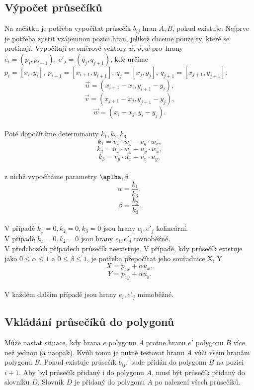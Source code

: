 \documentclass{article}
\begin{document}
\subsection{\small{Výpočet průsečíků}}
Na začátku je potřeba vypočítat průsečík $b_{ij}$ hran $A, B$, pokud existuje. Nejprve je potřeba zjistit vzájemnou pozici hran, jelikož chceme pouze ty, které se protínají. Vypočítají se směrové vektory $\vec{u}, \vec{v}, \vec{w}$ pro~hrany $e_{i} = (p_{i}, p_{i+1}),~e'_{j} = (q_{j}, q_{j+1})$, kde určíme $p_{i} = [x_{i}, y_{i}],~p_{i+1} = [x_{i+1}, y_{i+1}],~q_{j} = [x_{j}, y_{j}],~q_{j+1} = [x_{j+1}, y_{j+1}]$:\\
\[\vec{u} = (x_{i+1} - x_{i}, y_{i+1} - y_{i}),\]
\[\vec{v} = (x_{j+1} - x_{j}, y_{j+1} - y_{j}),\]
\[\vec{w} = (x_{i} - x_{j}, y_{i} - y_{j}).\]
\vspace{0cm}\\
Poté dopočítáme determinanty $k_{1}, k_{2}, k_{3}$\\
\[k_{1} = v_{x} \cdot w_{y} - v_{y} \cdot w_{x},\]
\[k_{2} = u_{x} \cdot w_{y} - u_{y} \cdot w_{x},\]
\[k_{3} = v_{y} \cdot u_{x} - v_{x} \cdot u_{y},\]
\vspace{0cm}\\
z nichž vypočítáme parametry $\aplha, \beta$\\
\[\alpha = \frac{k_{1}}{k_{3}},\]
\[\beta = \frac{k_{2}}{k_{3}}.\]
\vspace{0cm}\\
V případě $k_{1} = 0, k_{2} = 0, k_{3} = 0$ jsou hrany $e_{i}, e'_{j}$ kolineární.\\
V případě $k_{1} = 0, k_{2} = 0$ jsou hrany $e_{i}, e'_{j}$ rovnoběžné.\\
V předchozích případech průsečík neexistuje. V případě, kdy průsečík existuje jako $0 \leq \alpha \leq 1$ a $0 \leq \beta \leq 1$, je potřeba přepočítat jeho souřadnice X, Y\\
\[X = p_{1x} + \alpha u_{x},\]
\[Y = p_{1y} + \alpha u_{y}.\]
\vspace{0cm}\\
V každém dalším případě jsou hrany $e_{i}, e'_{j}$ mimoběžné.
\subsection{\small{Vkládání průsečíků do polygonů}}
Může nastat situace, kdy hrana $e$ polygonu $A$ protne hranu $e'$ polygonu $B$ více než jednou (a naopak). Kvůli tomu je nutné testovat hranu $A$ vůči všem hranám polygonu $B$. Pokud existuje průsečík $b_{ij}$, bude přidán do polygonu $B$ na pozici $i + 1$. Aby byl průsečík přidaný i do polygonu $A$, musí být průsečík přidaný do slovníku $D$. Slovník $D$ je přidaný do polygonu $A$ po nalezení všech průsečíků.
\end{document}
